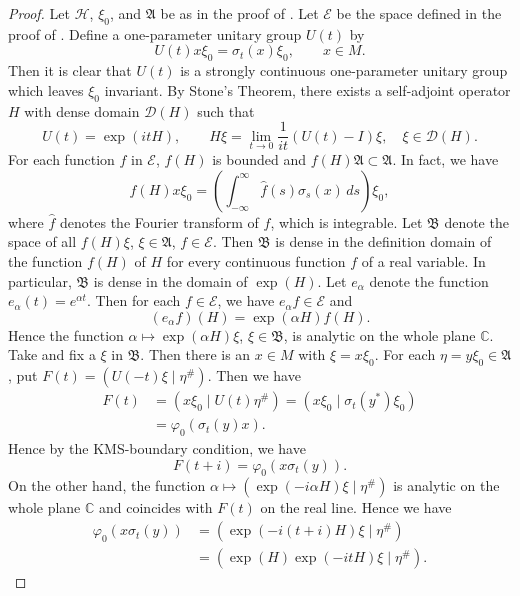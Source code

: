 \documentclass[12pt,b5paper,twoside]{article}
\theoremstyle{takesaki}
\numberwithin{equation}{section}
\begin{document}
\begin{proof}
Let $\mathcal H$, $\xi_0$, and $\mathfrak A$ be as in the proof of
.  Let $\mathcal E$ be the space defined in the proof
of .  Define a one-parameter unitary group $U(t)$ by
\[
  U(t)x\xi_0=\sigma_t(x)\xi_0,
  \qquad x\in M.
\]
Then it is clear that $U(t)$ is a strongly continuous one-parameter
unitary group which leaves $\xi_0$ invariant.  By Stone's Theorem,
there exists a self-adjoint operator $H$ with dense domain
$\mathcal D(H)$ such that
\begin{equation}
 U(t)=\exp(itH),
 \qquad
 H\xi=\lim_{t\to0}\frac{1}{it}(U(t)-I)\xi,
 \quad \xi\in\mathcal D(H).
 \tag{13.6}\label{eq:13.6}
\end{equation}
For each function $f$ in $\mathcal E$, $f(H)$ is bounded and
$f(H)\mathfrak A\subset\mathfrak A$.  In fact, we have
\[
 f(H)x\xi_0
 =\left(\int_{-\infty}^{\infty}\widehat f(s)\sigma_s(x)\,ds\right)
 \xi_0,
\]
where $\widehat f$ denotes the Fourier transform of $f$, which is
integrable.  Let $\mathfrak B$ denote the space of all $f(H)\xi$,
$\xi\in\mathfrak A$, $f\in\mathcal E$.  Then $\mathfrak B$ is dense
in the definition domain of the function $f(H)$ of $H$ for every
continuous function $f$ of a real variable.  In particular,
$\mathfrak B$ is dense in the domain of $\exp(H)$.  Let $e_\alpha$
denote the function $e_\alpha(t)=e^{\alpha t}$.  Then for each
$f\in\mathcal E$, we have $e_\alpha f\in\mathcal E$ and
\[
 (e_\alpha f)(H)=\exp(\alpha H)f(H).
\]
Hence the function $\alpha\mapsto\exp(\alpha H)\xi$,
$\xi\in\mathfrak B$, is analytic on the whole
plane $\mathbb C$.  Take and fix a $\xi$ in $\mathfrak B$.  Then
there is an $x\in M$ with $\xi=x\xi_0$.  For each
$\eta=y\xi_0\in\mathfrak A$, put
$F(t)=(U(-t)\xi\mid\eta^{\#})$.  Then we have
\begin{align*}
 F(t)&=(x\xi_0\mid U(t)\eta^{\#})
      =(x\xi_0\mid\sigma_t(y^*)\xi_0)\\
     &=\varphi_0(\sigma_t(y)x).
\end{align*}
Hence by the KMS-boundary condition, we have
\[
  F(t+i)=\varphi_0(x\sigma_t(y)).
\]
On the other hand, the function
$\alpha\mapsto(\exp(-i\alpha H)\xi\mid\eta^{\#})$ is analytic on the
whole plane $\mathbb C$ and coincides with $F(t)$ on the real line.
Hence we have
\begin{align*}
 \varphi_0(x\sigma_t(y))
 &=(\exp(-i(t+i)H)\xi\mid\eta^{\#})\\
 &=(\exp(H)\exp(-itH)\xi\mid\eta^{\#}).
\end{align*}

\end{proof}
\end{document}
